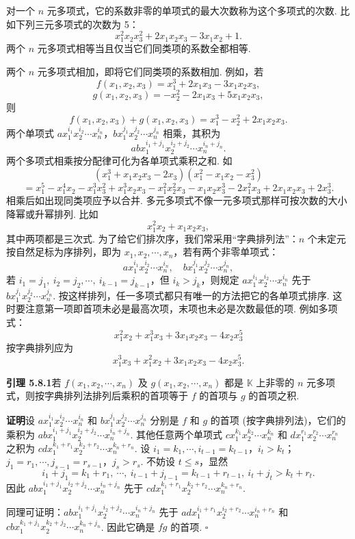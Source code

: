 \documentclass[UTF8, 12pt, fontset=fandol, oneside]{ctexart}
\begin{document}
对一个 $n$ 元多项式，它的系数非零的单项式的最大次数称为这个多项式的次数. 比如下列三元多项式的次数为 5：
\[
x_1^2x_2x_3^2+2x_1x_2x_3-3x_1x_2+1.
\]
两个 $n$ 元多项式相等当且仅当它们同类项的系数全都相等.

两个 $n$ 元多项式相加，即将它们同类项的系数相加. 例如，若
\[
f(x_1,x_2,x_3)=x_1^3+2x_1x_3-3x_1x_2x_3,
\]
\[
g(x_1,x_2,x_3)=-x_2^2-2x_1x_3+5x_1x_2x_3,
\]
则
\[
f(x_1,x_2,x_3)+g(x_1,x_2,x_3)=x_1^3-x_2^2+2x_1x_2x_3.
\]
两个单项式 $ax_1^{i_1}x_2^{i_2}\cdots x_n^{i_n}$，$bx_1^{j_1}x_2^{j_2}\cdots x_n^{j_n}$ 相乘，其积为
\[
abx_1^{i_1+j_1}x_2^{i_2+j_2}\cdots x_n^{i_n+j_n}.
\]
两个多项式相乘按分配律可化为各单项式乘积之和. 如
\[
(x_1^3+x_1x_2x_3-2x_3)(x_1^2-x_1x_2-x_3^2)
\]
\[
=x_1^5-x_1^4x_2-x_1^3x_3^2+x_1^3x_2x_3-x_1^2x_2^2x_3-x_1x_2x_3^3-2x_1^2x_3+2x_1x_2x_3+2x_3^3.
\]
相乘后如出现同类项应予以合并. 多元多项式不像一元多项式那样可按次数的大小降幂或升幂排列. 比如
\[
x_1^2x_2+x_1x_2x_3,
\]
其中两项都是三次式. 为了给它们排次序，我们常采用“字典排列法”：$n$ 个未定元按自然足标为序排列，即为 $x_1,x_2,\cdots,x_n$，若有两个非零单项式：
\[
ax_1^{i_1}x_2^{i_2}\cdots x_n^{i_n},\quad bx_1^{j_1}x_2^{j_2}\cdots x_n^{j_n},
\]
若 $i_1=j_1,\ i_2=j_2,\cdots,\ i_{k-1}=j_{k-1}$，但 $i_k>j_k$，则规定 $ax_1^{i_1}x_2^{i_2}\cdots x_n^{i_n}$ 先于 $bx_1^{j_1}x_2^{j_2}\cdots x_n^{j_n}$. 按这样排列，任一多项式都只有唯一的方法把它的各单项式排序. 这时要注意第一项即首项未必是最高次项，末项也未必是次数最低的项. 例如多项式：
\[
x_1^2x_2+x_1^3x_3+3x_1x_2x_3-4x_2x_3^5
\]
按字典排列应为
\[
x_1^3x_3+x_1^2x_2+3x_1x_2x_3-4x_2x_3^5.
\]

\noindent\textbf{引理 5.8.1}\quad 若 $f(x_1,x_2,\cdots,x_n)$ 及 $g(x_1,x_2,\cdots,x_n)$ 都是 $\mathbb{K}$ 上非零的 $n$ 元多项式，则按字典排列法排列后乘积的首项等于 $f$ 的首项与 $g$ 的首项之积.

\noindent\textbf{证明}\quad 设 $ax_1^{i_1}x_2^{i_2}\cdots x_n^{i_n}$ 和 $bx_1^{j_1}x_2^{j_2}\cdots x_n^{j_n}$ 分别是 $f$ 和 $g$ 的首项 (按字典排列法)，它们的乘积为 $abx_1^{i_1+j_1}x_2^{i_2+j_2}\cdots x_n^{i_n+j_n}$. 其他任意两个单项式 $cx_1^{k_1}x_2^{k_2}\cdots x_n^{k_n}$ 和 $dx_1^{r_1}x_2^{r_2}\cdots x_n^{r_n}$ 之积为 $cdx_1^{k_1+r_1}x_2^{k_2+r_2}\cdots x_n^{k_n+r_n}$. 设 $i_1=k_1,\cdots,i_{t-1}=k_{t-1}$，$i_t>k_t$；$j_1=r_1,\cdots,j_{s-1}=r_{s-1}$，$j_s>r_s$. 不妨设 $t\leq s$，显然
\[
i_1+j_1=k_1+r_1,\ \cdots,\ i_{t-1}+j_{t-1}=k_{t-1}+r_{t-1},\ i_t+j_t>k_t+r_t.
\]
因此 $abx_1^{i_1+j_1}x_2^{i_2+j_2}\cdots x_n^{i_n+j_n}$ 先于 $cdx_1^{k_1+r_1}x_2^{k_2+r_2}\cdots x_n^{k_n+r_n}$.

同理可证明：$abx_1^{i_1+j_1}x_2^{i_2+j_2}\cdots x_n^{i_n+j_n}$ 先于 $adx_1^{i_1+r_1}x_2^{i_2+r_2}\cdots x_n^{i_n+r_n}$ 和 $cbx_1^{k_1+j_1}x_2^{k_2+j_2}\cdots x_n^{k_n+j_n}$. 因此它确是 $fg$ 的首项. $\square$
\end{document}
